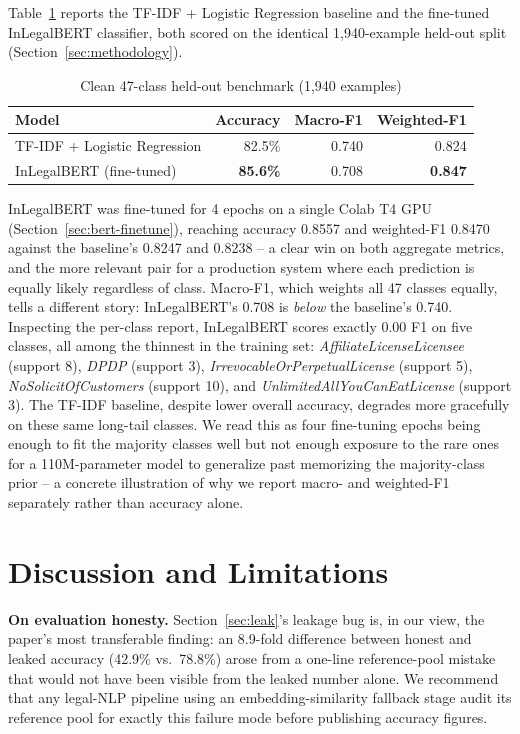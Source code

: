 \documentclass[conference]{IEEEtran}
\begin{document}
Table~\ref{tab:benchmark} reports the TF-IDF + Logistic Regression baseline and the fine-tuned InLegalBERT classifier, both scored on the identical 1{,}940-example held-out split (Section~\ref{sec:methodology}).

\begin{table}[t]
\caption{Clean 47-class held-out benchmark (1{,}940 examples)}
\label{tab:benchmark}
\centering
\begin{tabular}{@{}lrrr@{}}
\toprule
Model & Accuracy & Macro-F1 & Weighted-F1 \\
\midrule
TF-IDF + Logistic Regression & 82.5\% & 0.740 & 0.824 \\
InLegalBERT (fine-tuned) & \textbf{85.6\%} & 0.708 & \textbf{0.847} \\
\bottomrule
\end{tabular}
\end{table}

InLegalBERT was fine-tuned for 4 epochs on a single Colab T4 GPU (Section~\ref{sec:bert-finetune}), reaching accuracy 0.8557 and weighted-F1 0.8470 against the baseline's 0.8247 and 0.8238 -- a clear win on both aggregate metrics, and the more relevant pair for a production system where each prediction is equally likely regardless of class. Macro-F1, which weights all 47 classes equally, tells a different story: InLegalBERT's 0.708 is \emph{below} the baseline's 0.740. Inspecting the per-class report, InLegalBERT scores exactly 0.00 F1 on five classes, all among the thinnest in the training set: \textit{AffiliateLicenseLicensee} (support 8), \textit{DPDP} (support 3), \textit{IrrevocableOrPerpetualLicense} (support 5), \textit{NoSolicitOfCustomers} (support 10), and \textit{UnlimitedAllYouCanEatLicense} (support 3). The TF-IDF baseline, despite lower overall accuracy, degrades more gracefully on these same long-tail classes. We read this as four fine-tuning epochs being enough to fit the majority classes well but not enough exposure to the rare ones for a 110M-parameter model to generalize past memorizing the majority-class prior -- a concrete illustration of why we report macro- and weighted-F1 separately rather than accuracy alone.

\section{Discussion and Limitations}
\label{sec:discussion}

\textbf{On evaluation honesty.} Section~\ref{sec:leak}'s leakage bug is, in our view, the paper's most transferable finding: an 8.9-fold difference between honest and leaked accuracy (42.9\% vs.\ 78.8\%) arose from a one-line reference-pool mistake that would not have been visible from the leaked number alone. We recommend that any legal-NLP pipeline using an embedding-similarity fallback stage audit its reference pool for exactly this failure mode before publishing accuracy figures.
\end{document}
